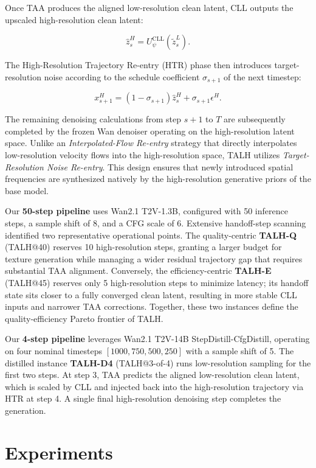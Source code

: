Once TAA produces the aligned low-resolution clean latent, CLL outputs
the upscaled high-resolution clean latent:

\[
\widehat z_s^H=U_\psi^{\mathrm{CLL}}(\widetilde z_s^L).
\]

The High-Resolution Trajectory Re-entry (HTR) phase then introduces
target-resolution noise according to the schedule coefficient
\(\sigma_{s+1}\) of the next timestep:

\[
x_{s+1}^H
=(1-\sigma_{s+1})\widehat z_s^H
+\sigma_{s+1}\epsilon^H.
\]

The remaining denoising calculations from step \(s+1\) to \(T\) are
subsequently completed by the frozen Wan denoiser operating on the
high-resolution latent space. Unlike an \emph{Interpolated-Flow
Re-entry} strategy that directly interpolates low-resolution velocity
flows into the high-resolution space, TALH utilizes
\emph{Target-Resolution Noise Re-entry}. This design ensures that newly
introduced spatial frequencies are synthesized natively by the
high-resolution generative priors of the base model.

Our \textbf{50-step pipeline} uses Wan2.1 T2V-1.3B, configured with 50
inference steps, a sample shift of 8, and a CFG scale of 6. Extensive
handoff-step scanning identified two representative operational points.
The quality-centric \textbf{TALH-Q} (TALH@40) reserves 10
high-resolution steps, granting a larger budget for texture generation
while managing a wider residual trajectory gap that requires substantial
TAA alignment. Conversely, the efficiency-centric \textbf{TALH-E}
(TALH@45) reserves only 5 high-resolution steps to minimize latency; its
handoff state sits closer to a fully converged clean latent, resulting
in more stable CLL inputs and narrower TAA corrections. Together, these
two instances define the quality-efficiency Pareto frontier of TALH.

Our \textbf{4-step pipeline} leverages Wan2.1 T2V-14B
StepDistill-CfgDistill, operating on four nominal timesteps
\([1000, 750, 500, 250]\) with a sample shift of 5. The distilled
instance \textbf{TALH-D4} (TALH@3-of-4) runs low-resolution sampling for
the first two steps. At step 3, TAA predicts the aligned low-resolution
clean latent, which is scaled by CLL and injected back into the
high-resolution trajectory via HTR at step 4. A single final
high-resolution denoising step completes the generation.

\section{Experiments}

